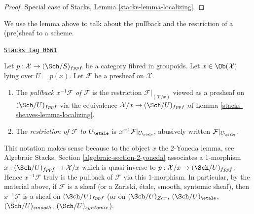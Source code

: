 \begin{proof}
Special case of Stacks, Lemma \ref{stacks-lemma-localizing}.
\end{proof}

We use the lemma above to talk about the pullback and the restriction
of a (pre)sheaf to a scheme.

\begin{definition}[Pullback]
\label{stacks-sheaves-definition-pullback}
\href{https://stacks.math.columbia.edu/tag/06W1}{\texttt{Stacks tag 06W1}}

Let $p : \mathcal{X} \to (\Sch/S)_{fppf}$ be a category fibred
in groupoids. Let $x \in \Ob(\mathcal{X})$ lying over $U = p(x)$.
Let $\mathcal{F}$ be a presheaf on $\mathcal{X}$.
\begin{enumerate}
\item The {\it pullback $x^{-1}\mathcal{F}$ of $\mathcal{F}$} is the
restriction $\mathcal{F}|_{(\mathcal{X}/x)}$ viewed as a presheaf on
$(\Sch/U)_{fppf}$ via the equivalence
$\mathcal{X}/x \to (\Sch/U)_{fppf}$ of
Lemma \ref{stacks-sheaves-lemma-localizing}.
\item The {\it restriction of $\mathcal{F}$ to $U_\etale$}
is $x^{-1}\mathcal{F}|_{U_\etale}$, abusively written
$\mathcal{F}|_{U_\etale}$.
\end{enumerate}
\end{definition}

This notation makes sense because to the object $x$ the $2$-Yoneda lemma, see
Algebraic Stacks, Section \ref{algebraic-section-2-yoneda}
associates a $1$-morphism $x : (\Sch/U)_{fppf} \to \mathcal{X}/x$
which is quasi-inverse to $p : \mathcal{X}/x \to (\Sch/U)_{fppf}$.
Hence $x^{-1}\mathcal{F}$ truly is the pullback of $\mathcal{F}$ via this
$1$-morphism. In particular, by the material above, if $\mathcal{F}$
is a sheaf (or a Zariski, \'etale, smooth, syntomic sheaf), then
$x^{-1}\mathcal{F}$ is a sheaf on $(\Sch/U)_{fppf}$ (or on
$(\Sch/U)_{Zar}$, $(\Sch/U)_\etale$,
$(\Sch/U)_{smooth}$, $(\Sch/U)_{syntomic}$).

